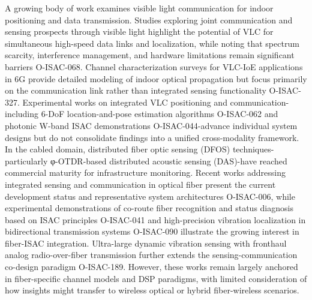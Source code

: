 {} A growing body of work examines visible light communication for indoor positioning and data transmission. Studies exploring joint communication and sensing prospects through visible light highlight the potential of VLC for simultaneous high-speed data links and localization, while noting that spectrum scarcity, interference management, and hardware limitations remain significant barriers O-ISAC-068. Channel characterization surveys for VLC-IoE applications in 6G provide detailed modeling of indoor optical propagation but focus primarily on the communication link rather than integrated sensing functionality O-ISAC-327. Experimental works on integrated VLC positioning and communication-including 6-DoF location-and-pose estimation algorithms O-ISAC-062 and photonic W-band ISAC demonstrations O-ISAC-044-advance individual system designs but do not consolidate findings into a unified cross-modality framework.\markdownRendererParagraphSeparator
{} In the cabled domain, distributed fiber optic sensing (DFOS) techniques-particularly φ-OTDR-based distributed acoustic sensing (DAS)-have reached commercial maturity for infrastructure monitoring. Recent works addressing integrated sensing and communication in optical fiber present the current development status and representative system architectures O-ISAC-006, while experimental demonstrations of co-route fiber recognition and status diagnosis based on ISAC principles O-ISAC-041 and high-precision vibration localization in bidirectional transmission systems O-ISAC-090 illustrate the growing interest in fiber-ISAC integration. Ultra-large dynamic vibration sensing with fronthaul analog radio-over-fiber transmission further extends the sensing-communication co-design paradigm O-ISAC-189. However, these works remain largely anchored in fiber-specific channel models and DSP paradigms, with limited consideration of how insights might transfer to wireless optical or hybrid fiber-wireless scenarios.\markdownRendererParagraphSeparator
